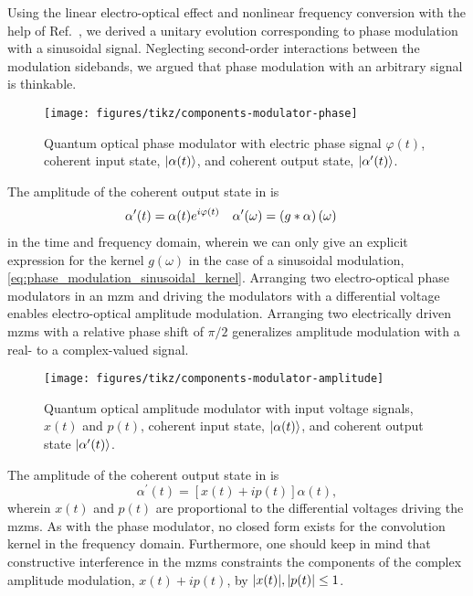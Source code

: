 Using the linear electro-optical effect and nonlinear frequency conversion with the help of Ref.~\cite{Horoshko2018,QuesadaMejia2015}, we derived a unitary evolution corresponding to phase modulation with a sinusoidal signal.
Neglecting second-order interactions between the modulation sidebands, we argued that phase modulation with an arbitrary signal is thinkable.
\begin{figure}[htb]
    \centering
    \texttt{[image: figures/tikz/components-modulator-phase]}
    \caption{Quantum optical phase modulator with electric phase signal $\varphi(t)$, coherent input state, $\lvert\alpha(t)\rangle$, and coherent output state, $\lvert\alpha^\prime(t)\rangle$.}\label{fig:components_modulator_phase}
\end{figure}
The amplitude of the coherent output state in  is
\begin{align}
	\alpha^\prime(t)
	&=
	\alpha(t)
	e^{i\varphi(t)}
	&
	\alpha^\prime(\omega)
	&=
	\left(g\ast\alpha\right)(\omega)
\end{align}
in the time and frequency domain, wherein we can only give an explicit expression for the kernel $g(\omega)$ in the case of a sinusoidal modulation, \cref{eq:phase_modulation_sinusoidal_kernel}.
Arranging two electro-optical phase modulators in an \gls{mzm} and driving the modulators with a differential voltage enables electro-optical amplitude modulation.
Arranging two electrically driven \gls{mzm}s with a relative phase shift of $\pi/2$ generalizes amplitude modulation with a real- to a complex-valued signal.
\begin{figure}[htb]
    \centering
    \texttt{[image: figures/tikz/components-modulator-amplitude]}
    \caption{Quantum optical amplitude modulator with input voltage signals, $x(t)$ and $p(t)$, coherent input state, $\lvert\alpha(t)\rangle$, and coherent output state $\lvert\alpha^\prime(t)\rangle$.}\label{fig:components_modulator_phase}
\end{figure}
The amplitude of the coherent output state in  is
\begin{equation}
	\alpha^\prime(t)
	=
	\left[
		x(t)
		+
		ip(t)
	\right]
	\alpha(t)
	,
\end{equation}
wherein $x(t)$ and $p(t)$ are proportional to the differential voltages driving the \gls{mzm}s.
As with the phase modulator, no closed form exists for the convolution kernel in the frequency domain.
Furthermore, one should keep in mind that constructive interference in the \gls{mzm}s constraints the components of the complex amplitude modulation, $x(t)+ip(t)$, by $\lvert x(t)\rvert,\lvert p(t)\rvert\leq1$.

